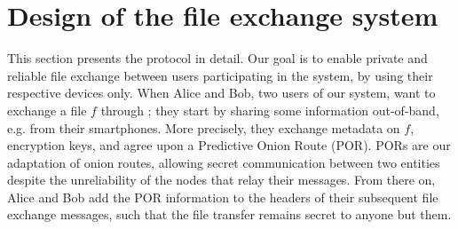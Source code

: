 \section{Design of the \name file exchange system}
\label{design}

This section presents the \name protocol in detail.
Our goal is to enable private and reliable file exchange between users participating in the system, by using their respective devices only.
When Alice and Bob, two users of our system, want to exchange a file $f$ through \name; they start by sharing some information out-of-band, e.g. from their smartphones.
More precisely, they exchange metadata on $f$, encryption keys, and agree upon a Predictive Onion Route (POR).
PORs are our adaptation of onion routes, allowing secret communication between two entities despite the unreliability of the nodes that relay their messages.
From there on, Alice and Bob add the POR information to the headers of their subsequent file exchange messages, such that the file transfer remains secret to anyone but them.



